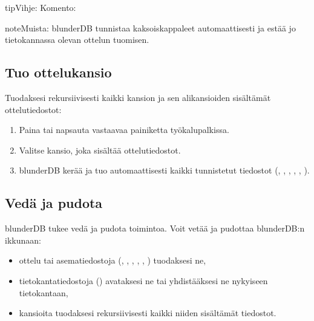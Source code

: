 \documentclass[letterpaper,10pt,finnish]{sphinxmanual}
\begin{document}
\begin{sphinxadmonition}{tip}{Vihje:}
\sphinxAtStartPar
Komento: 
\end{sphinxadmonition}

\begin{sphinxadmonition}{note}{Muista:}
\sphinxAtStartPar
blunderDB tunnistaa kaksoiskappaleet automaattisesti ja estää jo tietokannassa olevan ottelun tuomisen.
\end{sphinxadmonition}


\subsection{Tuo ottelukansio}
\label{\detokenize{guide_utilisateur:importer-un-dossier-de-matchs}}
\sphinxAtStartPar
Tuodaksesi rekursiivisesti kaikki kansion ja sen alikansioiden sisältämät ottelutiedostot:
\begin{enumerate}
%
\item {} 
\sphinxAtStartPar
Paina  tai napsauta vastaavaa painiketta työkalupalkissa.

\item {} 
\sphinxAtStartPar
Valitse kansio, joka sisältää ottelutiedostot.

\item {} 
\sphinxAtStartPar
blunderDB kerää ja tuo automaattisesti kaikki tunnistetut tiedostot (, , , , , ).

\end{enumerate}


\subsection{Vedä ja pudota}
\label{\detokenize{guide_utilisateur:glisser-deposer}}
\sphinxAtStartPar
blunderDB tukee vedä ja pudota \sphinxhyphen{}toimintoa. Voit vetää ja pudottaa blunderDB:n ikkunaan:
\begin{itemize}
\item {} 
\sphinxAtStartPar
ottelu\sphinxhyphen{} tai asematiedostoja (, , , , , ) tuodaksesi ne,

\item {} 
\sphinxAtStartPar
tietokantatiedostoja () avataksesi ne tai yhdistääksesi ne nykyiseen tietokantaan,

\item {} 
\sphinxAtStartPar
kansioita tuodaksesi rekursiivisesti kaikki niiden sisältämät tiedostot.

\end{itemize}
\end{document}
